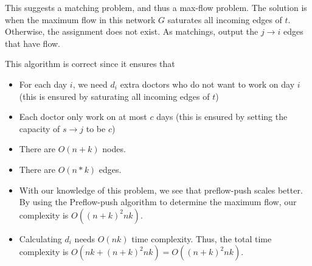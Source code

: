 This suggests a matching problem, and thus a max-flow problem. The solution is when the maximum flow in this network $G$ saturates all incoming edges of $t$. Otherwise, the assignment does not exist. As matchings, output the $j \rightarrow i$ edges that have flow.



This algorithm is correct since it ensures that 

\begin{itemize}
\item For each day $i$, we need $d_i$ extra doctors who do not want to work on day $i$ (this is ensured by saturating all incoming edges of $t$)
\item Each doctor only work on at most $c$ days (this is ensured by setting the capacity of $s \rightarrow j$ to be $c$)
\end{itemize}


\begin{itemize}
\item There are $O(n+k)$ nodes.
\item There are $O(n*k)$ edges.
\item With our knowledge of this problem, we see that preflow-push scales better. By using the Preflow-push algorithm to determine the maximum flow, our complexity is $O((n+k)^2 nk)$.
\item Calculating $d_i$ needs $O(nk)$ time complexity. Thus, the total time complexity is $O(nk+(n+k)^2 nk) = O((n+k)^2 nk)$.
\end{itemize}


